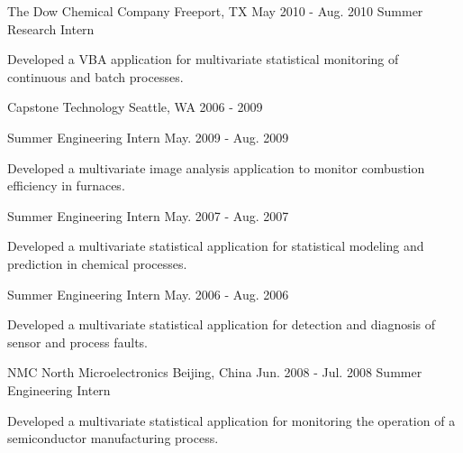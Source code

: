 

\begin{cventries}
\cventry
{The Dow Chemical Company} %
{Freeport, TX} %
{May 2010 - Aug. 2010} %
{Summer Research Intern} %
{
\begin{cvitems} %
\item {Developed a VBA application for multivariate statistical monitoring of continuous and batch processes.}
\end{cvitems}
}%
\cvmultientry
{Capstone Technology} %
{Seattle, WA}
{2006 - 2009} %
{
\cvsubentry
{Summer Engineering Intern} %
{} %
{May. 2009 - Aug. 2009} %
{
\begin{cvitems} %
\item {Developed a multivariate image analysis application to monitor combustion efficiency in furnaces.}
\end{cvitems}
}%
\cvsubentry
{Summer Engineering Intern} %
{} %
{May. 2007 - Aug. 2007} %
{
\begin{cvitems} %
\item {Developed a multivariate statistical application for statistical modeling and prediction in chemical processes.}
\end{cvitems}
}%
\cvsubentry
{Summer Engineering Intern} %
{} %
{May. 2006 - Aug. 2006} %
{
\begin{cvitems} %
\item {Developed a multivariate statistical application for detection and diagnosis of sensor and process faults.}
\end{cvitems}
}
}

\cventry
{NMC North Microelectronics} %
{Beijing, China} %
{Jun. 2008 - Jul. 2008} %
{Summer Engineering Intern} %
{
\begin{cvitems} %
\item {Developed a multivariate statistical application for monitoring the operation of a semiconductor manufacturing process.}
\end{cvitems}
}
\end{cventries}

